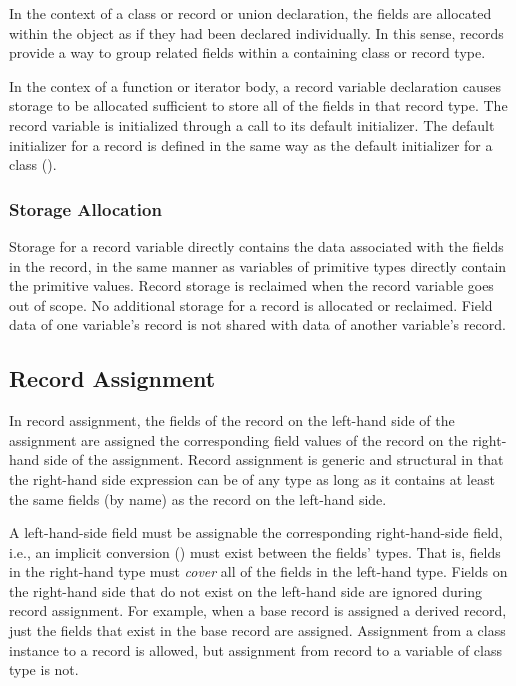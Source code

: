 In the context of a class or record or union declaration, the fields are
allocated within the object as if they had been declared individually.  In this
sense, records provide a way to group related fields within a containing class
or record type. 

In the contex of a function or iterator body, a record variable declaration
causes storage to be allocated sufficient to store all of the fields in that
record type.  The record variable is initialized through a call to its
default initializer.  The default initializer for a record is defined in the
same way as the default initializer for a class ().

\subsubsection{Storage Allocation}
\label{Record_Storage}

Storage for a record variable directly contains the data associated
with the fields in the record, in the same manner as variables
of primitive types directly contain the primitive values.
Record storage is reclaimed when the record variable goes out of scope.
No additional storage for a record is allocated or reclaimed.
Field data of one variable's record is not shared with data
of another variable's record.

\subsection{Record Assignment}
\label{Record_Assignment}

In record assignment, the fields of the record on the left-hand side
of the assignment are assigned the corresponding field values of the record
on the right-hand side of the assignment.
Record assignment is generic and structural in that the
right-hand side expression can be of any type as long as it
contains at least the same fields (by name) as the record on the left-hand
side.

A left-hand-side field must be assignable the corresponding
right-hand-side field, i.e., an implicit conversion
() must exist between the fields' types.  That is,
fields in the right-hand type must \emph{cover} all of the fields in the
left-hand type.
Fields on the right-hand side that do not exist on the left-hand side
are ignored during record assignment.  For example, when a base record is
assigned a derived record, just the fields that exist in the base
record are assigned.
Assignment from a class instance to a record is allowed, but assignment
from record to a variable of class type is not.

